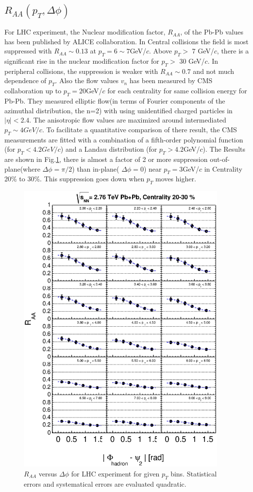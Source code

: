 	\subsection{$R_{AA}(p_T, \Delta\phi)$}
	For LHC experiment, the Nuclear modification factor, $R_{AA}$, of the Pb-Pb values has been published by ALICE collaboration\cite{Abelev:2012hxa}. In Central collisions the field is most suppressed with $R_{AA}\sim0.13$ at $p_T=6\sim7$GeV/$c$. Above $p_T >$ 7 GeV/$c$, there is a significant rise in the nuclear modification factor for $p_T >$ 30 GeV/$c$.  In peripheral collisions, the suppression is weaker with $R_{AA} \sim 0.7$ and not much dependence of $p_T$. Also the flow values $v_n$ has been measured by CMS collaboration\cite{Chatrchyan:2012ta} up to $p_T=20$GeV/$c$ for each centrality for same collision energy for Pb-Pb. They measured elliptic flow(in terms of Fourier components of the azimuthal distribution, the n=2) with using unidentified charged particles in $|\eta| < 2.4$. The anisotropic flow values are maximized around intermediated $p_T \sim 4GeV/c$. To facilitate a quantitative comparison of there result, the CMS measurements are fitted with a combination of a fifth-order polynomial function (for $p_T < 4.2GeV/c$) and a Landau distribution (for $p_T > 4.2$GeV/$c$). The Results are shown in Fig.\ref{apendfig2}, there is almost a factor of 2 or more suppression out-of-plane(where $\Delta \phi = \pi /2 $) than in-plane( $\Delta \phi = 0 $) near $p_T = 3$GeV/$c$ in Centrality 20\% to 30\%. This suppression goes down when $p_{T}$ moves higher. 
\begin{figure}[htbp]
\begin{center}
\includegraphics[height=15cm]{figures/Fig_pathlength/fig3.eps}
\caption{$R_{AA}$ versus $\Delta \phi$ for LHC experiment for given $p_{T}$ bins. Statistical errors and systematical errors are evaluated quadratic.}
\label{apendfig2}
\end{center}
\end{figure}
